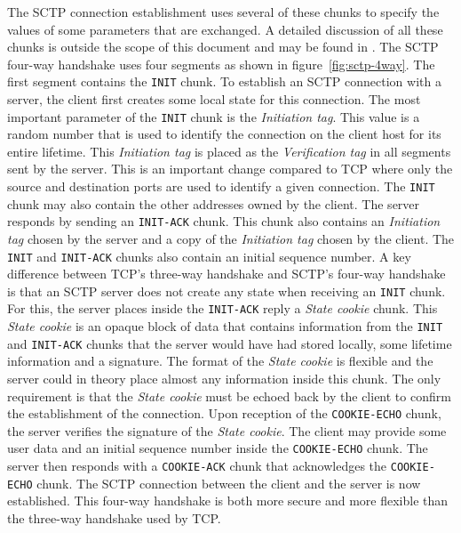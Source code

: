 The SCTP connection establishment uses several of these chunks to specify the values of some parameters that are exchanged. A detailed discussion of all these chunks is outside the scope of this document and may be found in \cite{rfc4960}. The SCTP four-way handshake uses four segments as shown in figure~\ref{fig:sctp-4way}. The first segment contains the \texttt{INIT} chunk. To establish an SCTP connection with a server, the client first creates some local state for this connection. The most important parameter of the \texttt{INIT} chunk is the \emph{Initiation tag}. This value is a random number that is used to identify the connection on the client host for its entire lifetime. This \emph{Initiation tag} is placed as the \emph{Verification tag} in all segments sent by the server. This is an important change compared to TCP where only the source and destination ports are used to identify a given connection. The \texttt{INIT} chunk may also contain the other addresses owned by the client. The server responds by sending an \texttt{INIT-ACK} chunk. This chunk also contains an \emph{Initiation tag} chosen by the server and a copy of the \emph{Initiation tag} chosen by the client. The \texttt{INIT} and \texttt{INIT-ACK} chunks also contain an initial sequence number. A key difference between TCP's three-way handshake and SCTP's four-way handshake is that an SCTP server does not create any state when receiving an \texttt{INIT} chunk. For this, the server places inside the \texttt{INIT-ACK} reply a \emph{State cookie} chunk. This \emph{State cookie} is an opaque block of data that contains information from the \texttt{INIT} and \texttt{INIT-ACK} chunks that the server would have had stored locally, some lifetime information and a signature. The format of the \emph{State cookie} is flexible and the server could in theory place almost any information inside this chunk. The only requirement is that the \emph{State cookie}  must be echoed back by the client to confirm the establishment of the connection. Upon reception of the \texttt{COOKIE-ECHO} chunk, the server verifies the signature of the \emph{State cookie}. The client may provide some user data and an initial sequence number inside the \texttt{COOKIE-ECHO} chunk. The server then responds with a \texttt{COOKIE-ACK} chunk that acknowledges the \texttt{COOKIE-ECHO} chunk. The SCTP connection between the client and the server is now established. This four-way handshake is both more secure and more flexible than the three-way handshake used by TCP. 

